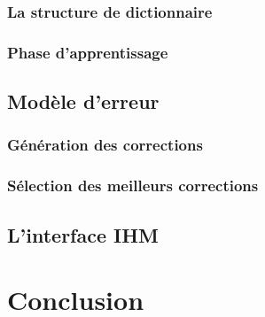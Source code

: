 \documentclass[10pt,a4paper]{article}
\begin{document}
\subsubsection{La structure de dictionnaire}
\subsubsection{Phase d'apprentissage}
\subsection{Modèle d'erreur}
\subsubsection{Génération des corrections}
\subsubsection{Sélection des meilleurs corrections}
\subsection{L'interface IHM}

\section{Conclusion}
\end{document}
